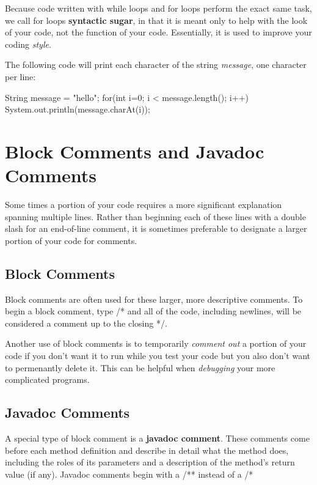 Because code written with while loops and for loops perform the exact same task, we call for loops \textbf{syntactic sugar}, in that it is meant only to help with the look of your code, not the function of your code. Essentially, it is used to improve your coding \textit{style}.

\begin{exa}
The following code will print each character of the string \textit{message}, one character per line:

\begin{code}
String message = "hello";
for(int i=0; i < message.length(); i++) {
  System.out.println(message.charAt(i));
}
\end{code}

\end{exa}


\section{Block Comments and Javadoc Comments}

Some times a portion of your code requires a more significant explanation spanning multiple lines. Rather than beginning each of these lines with a double slash for an end-of-line comment, it is sometimes preferable to designate a larger portion of your code for comments. 

\subsection{Block Comments}

Block comments are often used for these larger, more descriptive comments. To begin a block comment, type /* and all of the code, including newlines, will be considered a comment up to the closing */.

Another use of block comments is to temporarily \textit{comment out} a portion of your code if you don't want it to run while you test your code but you also don't want to permenantly delete it. This can be helpful when \textit{debugging} your more complicated programs. 

\subsection{Javadoc Comments}
A special type of block comment is a \textbf{javadoc comment}. These comments come before each method definition and describe in detail what the method does, including the roles of its parameters and a description of the method's return value (if any). Javadoc comments begin with a /** instead of a /*

